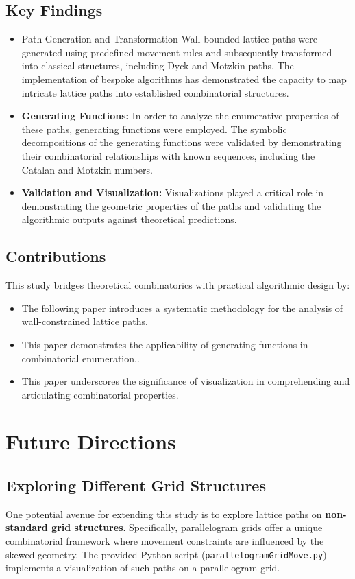 \documentclass{article}
\begin{document}
\subsection{Key Findings}
\begin{itemize}
    \item Path Generation and Transformation Wall-bounded lattice paths were generated using predefined movement rules and subsequently transformed into classical structures, including Dyck and Motzkin paths. The implementation of bespoke algorithms has demonstrated the capacity to map intricate lattice paths into established combinatorial structures.
    \item \textbf{Generating Functions:} In order to analyze the enumerative properties of these paths, generating functions were employed. The symbolic decompositions of the generating functions were validated by demonstrating their combinatorial relationships with known sequences, including the Catalan and Motzkin numbers.
    \item \textbf{Validation and Visualization:} Visualizations played a critical role in demonstrating the geometric properties of the paths and validating the algorithmic outputs against theoretical predictions.
\end{itemize}




\subsection{Contributions}

This study bridges theoretical combinatorics with practical algorithmic design by:
\begin{itemize}
    \item The following paper introduces a systematic methodology for the analysis of wall-constrained lattice paths.
    \item This paper demonstrates the applicability of generating functions in combinatorial enumeration..
    \item This paper underscores the significance of visualization in comprehending and articulating combinatorial properties.
\end{itemize}

\section{Future Directions}

\subsection{Exploring Different Grid Structures}
One potential avenue for extending this study is to explore lattice paths on \textbf{non-standard grid structures}. Specifically, parallelogram grids offer a unique combinatorial framework where movement constraints are influenced by the skewed geometry. The provided Python script (\texttt{parallelogramGridMove.py}) implements a visualization of such paths on a parallelogram grid.
\end{document}
